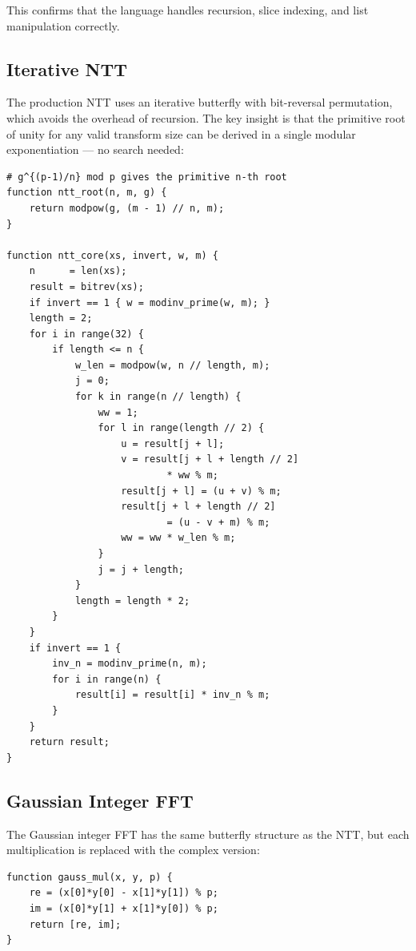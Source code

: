 \documentclass[conference]{IEEEtran}
\begin{document}
This confirms that the language handles recursion, slice indexing, and list manipulation correctly.

\subsection{Iterative NTT}

The production NTT uses an iterative butterfly with bit-reversal permutation, which avoids the overhead of recursion. The key insight is that the primitive root of unity for any valid transform size can be derived in a single modular exponentiation — no search needed:

\begin{lstlisting}
# g^{(p-1)/n} mod p gives the primitive n-th root
function ntt_root(n, m, g) {
    return modpow(g, (m - 1) // n, m);
}

function ntt_core(xs, invert, w, m) {
    n      = len(xs);
    result = bitrev(xs);
    if invert == 1 { w = modinv_prime(w, m); }
    length = 2;
    for i in range(32) {
        if length <= n {
            w_len = modpow(w, n // length, m);
            j = 0;
            for k in range(n // length) {
                ww = 1;
                for l in range(length // 2) {
                    u = result[j + l];
                    v = result[j + l + length // 2]
                            * ww % m;
                    result[j + l] = (u + v) % m;
                    result[j + l + length // 2]
                            = (u - v + m) % m;
                    ww = ww * w_len % m;
                }
                j = j + length;
            }
            length = length * 2;
        }
    }
    if invert == 1 {
        inv_n = modinv_prime(n, m);
        for i in range(n) {
            result[i] = result[i] * inv_n % m;
        }
    }
    return result;
}
\end{lstlisting}

\subsection{Gaussian Integer FFT}

The Gaussian integer FFT has the same butterfly structure as the NTT, but each multiplication is replaced with the complex version:

\begin{lstlisting}
function gauss_mul(x, y, p) {
    re = (x[0]*y[0] - x[1]*y[1]) % p;
    im = (x[0]*y[1] + x[1]*y[0]) % p;
    return [re, im];
}
\end{lstlisting}
\end{document}

